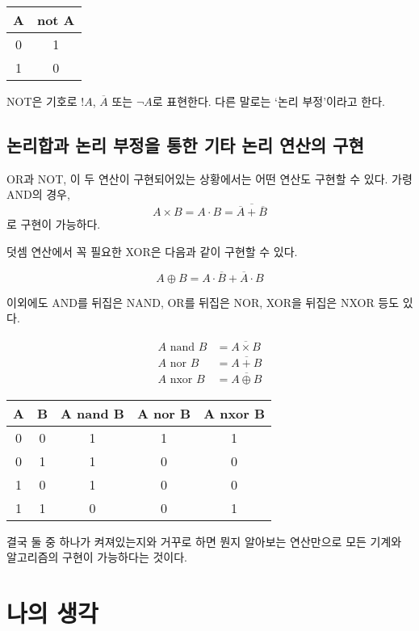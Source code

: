 \documentclass{article}
\begin{document}
\begin{center}
    \begin{tabular}{c|c}
        A & not A \\
        \hline
        0 & 1 \\
        1 & 0
    \end{tabular}
\end{center}

NOT은 기호로 $!A$, $\overline A$ 또는 $\neg A$로 표현한다. 다른 말로는 `논리 부정'이라고 한다.

\subsection{논리합과 논리 부정을 통한 기타 논리 연산의 구현}

OR과 NOT, 이 두 연산이 구현되어있는 상황에서는 어떤 연산도 구현할 수 있다. 가령 AND의 경우,
$$A \times B = A \cdot B = \overline{\overline A + \overline B}$$
로 구현이 가능하다.

덧셈 연산에서 꼭 필요한 XOR은 다음과 같이 구현할 수 있다.

$$
A \oplus B = {A} \cdot \overline B + \overline A \cdot B
$$

이외에도 AND를 뒤집은 NAND, OR를 뒤집은 NOR, XOR을 뒤집은 NXOR 등도 있다.

$$
\begin{aligned}
    A \text{ nand } B &= \overline{A \times B} \\
    A \text{ nor } B &= \overline{A + B} \\
    A \text{ nxor } B &= \overline{A \oplus B}
\end{aligned}
$$

\begin{center}
    \begin{tabular}{cc|ccc}
        A & B & A nand B & A nor B & A nxor B \\
        \hline
        0 & 0 & 1 & 1 & 1 \\
        0 & 1 & 1 & 0 & 0 \\
        1 & 0 & 1 & 0 & 0 \\
        1 & 1 & 0 & 0 & 1
    \end{tabular}
\end{center}

결국 둘 중 하나가 켜져있는지와 거꾸로 하면 뭔지 알아보는 연산만으로
모든 기계와 알고리즘의 구현이 가능하다는 것이다.

\section{나의 생각}
\end{document}
